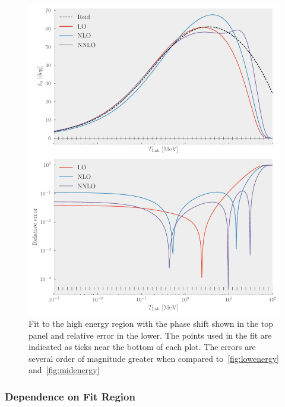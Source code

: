 \begin{figure}[pt]
  \centering
  \includegraphics{Figures/highenergy.pdf}
  \caption{\label{fig:highenergy}Fit to the high energy region with the phase
    shift shown in the top panel and relative error in the lower. The points
    used in the fit are indicated as ticks near the bottom of each plot. The
    errors are several order of magnitude greater when compared
    to~\cref{fig:lowenergy} and~\cref{fig:midenergy}}
\end{figure}

\subsubsection{Dependence on Fit Region}

